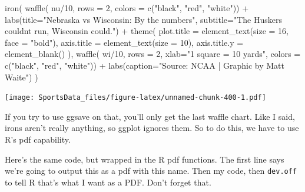 \documentclass[
]{book}
\newenvironment{Shaded}{\begin{snugshade}}{\end{snugshade}}
\newcommand{\AttributeTok}[1]{\textcolor[rgb]{0.77,0.63,0.00}{#1}}
\newcommand{\DecValTok}[1]{\textcolor[rgb]{0.00,0.00,0.81}{#1}}
\newcommand{\FunctionTok}[1]{\textcolor[rgb]{0.00,0.00,0.00}{#1}}
\newcommand{\NormalTok}[1]{#1}
\newcommand{\SpecialCharTok}[1]{\textcolor[rgb]{0.00,0.00,0.00}{#1}}
\newcommand{\StringTok}[1]{\textcolor[rgb]{0.31,0.60,0.02}{#1}}
\begin{document}
\begin{Shaded}
\begin{Highlighting}[]
\FunctionTok{iron}\NormalTok{(}
 \FunctionTok{waffle}\NormalTok{(}
\NormalTok{   nu}\SpecialCharTok{/}\DecValTok{10}\NormalTok{, }
   \AttributeTok{rows =} \DecValTok{2}\NormalTok{, }
   \AttributeTok{colors =} \FunctionTok{c}\NormalTok{(}\StringTok{"black"}\NormalTok{, }\StringTok{"red"}\NormalTok{, }\StringTok{"white"}\NormalTok{)) }\SpecialCharTok{+} 
   \FunctionTok{labs}\NormalTok{(}\AttributeTok{title=}\StringTok{"Nebraska vs Wisconsin: By the numbers"}\NormalTok{, }\AttributeTok{subtitle=}\StringTok{"The Huskers couldn\textquotesingle{}t run, Wisconsin could."}\NormalTok{) }\SpecialCharTok{+} 
   \FunctionTok{theme}\NormalTok{(}
    \AttributeTok{plot.title =} \FunctionTok{element\_text}\NormalTok{(}\AttributeTok{size =} \DecValTok{16}\NormalTok{, }\AttributeTok{face =} \StringTok{"bold"}\NormalTok{),}
    \AttributeTok{axis.title =} \FunctionTok{element\_text}\NormalTok{(}\AttributeTok{size =} \DecValTok{10}\NormalTok{),}
    \AttributeTok{axis.title.y =} \FunctionTok{element\_blank}\NormalTok{()}
\NormalTok{  ),}
 \FunctionTok{waffle}\NormalTok{(}
\NormalTok{   wi}\SpecialCharTok{/}\DecValTok{10}\NormalTok{, }
   \AttributeTok{rows =} \DecValTok{2}\NormalTok{, }
   \AttributeTok{xlab=}\StringTok{"1 square = 10 yards"}\NormalTok{, }
   \AttributeTok{colors =} \FunctionTok{c}\NormalTok{(}\StringTok{"black"}\NormalTok{, }\StringTok{"red"}\NormalTok{, }\StringTok{"white"}\NormalTok{)) }\SpecialCharTok{+} \FunctionTok{labs}\NormalTok{(}\AttributeTok{caption=}\StringTok{"Source: NCAA | Graphic by Matt Waite"}\NormalTok{)}
\NormalTok{) }
\end{Highlighting}
\end{Shaded}

\texttt{[image: SportsData\_files/figure-latex/unnamed-chunk-400-1.pdf]}

If you try to use ggsave on that, you'll only get the last waffle chart. Like I said, irons aren't really anything, so ggplot ignores them. So to do this, we have to use R's pdf capability.

Here's the same code, but wrapped in the R pdf functions. The first line says we're going to output this as a pdf with this name. Then my code, then \texttt{dev.off} to tell R that's what I want as a PDF. Don't forget that.
\end{document}
